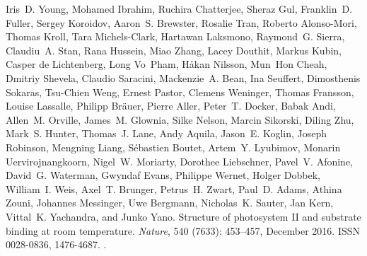 \documentclass[a4paper]{article}
\begin{document}
\begin{thebibliography}{33}
Iris~D. Young, Mohamed Ibrahim, Ruchira Chatterjee, Sheraz Gul, Franklin~D.
  Fuller, Sergey Koroidov, Aaron~S. Brewster, Rosalie Tran, Roberto
  {Alonso-Mori}, Thomas Kroll, Tara {Michels-Clark}, Hartawan Laksmono,
  Raymond~G. Sierra, Claudiu~A. Stan, Rana Hussein, Miao Zhang, Lacey Douthit,
  Markus Kubin, Casper {de Lichtenberg}, Long Vo~Pham, H{\aa}kan Nilsson,
  Mun~Hon Cheah, Dmitriy Shevela, Claudio Saracini, Mackenzie~A. Bean, Ina
  Seuffert, Dimosthenis Sokaras, Tsu-Chien Weng, Ernest Pastor, Clemens
  Weninger, Thomas Fransson, Louise Lassalle, Philipp Br{\"a}uer, Pierre Aller,
  Peter~T. Docker, Babak Andi, Allen~M. Orville, James~M. Glownia, Silke
  Nelson, Marcin Sikorski, Diling Zhu, Mark~S. Hunter, Thomas~J. Lane, Andy
  Aquila, Jason~E. Koglin, Joseph Robinson, Mengning Liang, S{\'e}bastien
  Boutet, Artem~Y. Lyubimov, Monarin Uervirojnangkoorn, Nigel~W. Moriarty,
  Dorothee Liebschner, Pavel~V. Afonine, David~G. Waterman, Gwyndaf Evans,
  Philippe Wernet, Holger Dobbek, William~I. Weis, Axel~T. Brunger, Petrus~H.
  Zwart, Paul~D. Adams, Athina Zouni, Johannes Messinger, Uwe Bergmann,
  Nicholas~K. Sauter, Jan Kern, Vittal~K. Yachandra, and Junko Yano.
\newblock Structure of photosystem {{II}} and substrate binding at room
  temperature.
\newblock \emph{Nature}, 540 (7633): 453--457, December 2016.
\newblock ISSN 0028-0836, 1476-4687.
\newblock {}.

\end{thebibliography}
\end{document}

